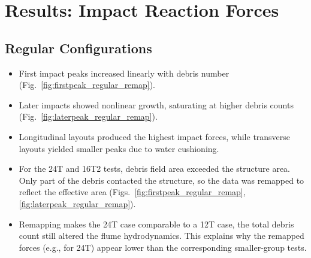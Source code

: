 \documentclass{article}
\begin{document}
\section{Results: Impact Reaction Forces}

\subsection{Regular Configurations}
\begin{itemize}
    \item First impact peaks increased linearly with debris number (Fig.~\ref{fig:firstpeak_regular_remap}).
    \item Later impacts showed nonlinear growth, saturating at higher debris counts (Fig.~\ref{fig:laterpeak_regular_remap}).
    \item Longitudinal layouts produced the highest impact forces, while transverse layouts yielded smaller peaks due to water cushioning.
    \item For the 24T and 16T2 tests, debris field area exceeded the structure area. Only part of the debris contacted the structure, so the data was remapped to reflect the effective area (Figs.~\ref{fig:firstpeak_regular_remap}, \ref{fig:laterpeak_regular_remap}).
    \item Remapping makes the 24T case comparable to a 12T case, the total debris count still altered the flume hydrodynamics. This explains why the remapped forces (e.g., for 24T) appear lower than the corresponding smaller-group tests.

\end{itemize}
\end{document}

